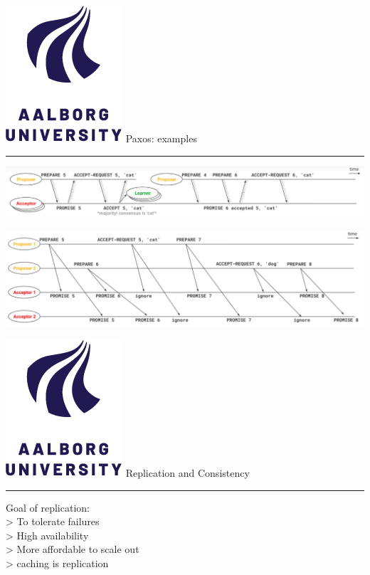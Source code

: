 \documentclass[aspectratio=1610,17pt,utf8]{beamer}
\newcommand{\mainframe}[1]{\color{blue} \includegraphics[width=.05\textwidth]{figures/aau.png} #1\\\color{black}\hrule}
\newcommand{\regularframe}[1]{\color{black}\includegraphics[width=.05\textwidth]{figures/aau.png} #1\\\hrule}
\begin{document}
\begin{frame}{\regularframe{Paxos: examples}}
    \includegraphics[width=\textwidth]{figures/paxos1.png}
    \vspace{30pt}

    \includegraphics[width=\textwidth]{figures/paxos2.png}
\end{frame}


\begin{frame}{\mainframe{Replication and Consistency}}
    Goal of replication:\\
    > To tolerate failures\\
    > High availability\\
    > More affordable to scale out\\
    > caching is replication
\end{frame}
\end{document}
